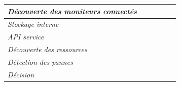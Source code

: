 \begin{table}[h!]
\begin{tabular}{|l|l|l|l|l|l|}
		\textit{Découverte des moniteurs connectés}          & \checkmark                                                                       &                                                                               &                                                                            &                                                                               &                                                                        \\ \hline
		\textit{Stockage interne}                            &                                                                                  &                                                                               & \checkmark                                                                 &                                                                               &                                                                        \\ \hline
		\textit{API service}                                 &                                                                                  &                                                                               &                                                                            &                                                                               &                                                                        \\ \hline
		\hline                                                                              
		\textit{Découverte des ressources}                   & \checkmark                                                                       &                                                                               &                                                                            &                                                                               &                                                                        \\ \hline
		\textit{Détection des pannes}                        &                                                                                  & \checkmark                                                                    &                                                                            &                                                                               &                                                                        \\ \hline
		\textit{Décision}                                    &                                                                                  &                                                                               &                                                                            &                                                                               &                                                                        \\ \hline

\end{tabular}
\end{table}
